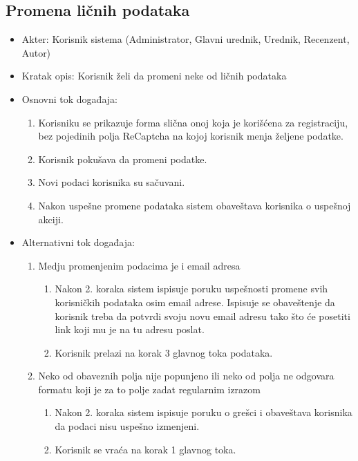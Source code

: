 \documentclass[a4paper]{article}
\begin{document}
\subsection{Promena ličnih podataka}
\begin{itemize}
    \item Akter: Korisnik sistema (Administrator, Glavni urednik, Urednik, Recenzent, Autor)
    \item Kratak opis: Korisnik želi da promeni neke od ličnih podataka
    \item Osnovni tok događaja:
        \begin{enumerate}
            \item Korisniku se prikazuje forma slična onoj koja je korišćena za registraciju, bez pojedinih polja ReCaptcha na kojoj korisnik menja željene podatke.
            \item Korisnik pokušava da promeni podatke.
            \item Novi podaci korisnika su sačuvani.
            \item Nakon uspešne promene podataka sistem obaveštava korisnika o uspešnoj akciji.
        \end{enumerate}
    \item Alternativni tok događaja:
        \begin{enumerate}
            \item Medju promenjenim podacima je i email adresa
                \begin{enumerate}
                    \item Nakon 2. koraka sistem ispisuje poruku uspešnosti promene svih korisničkih podataka osim email adrese. Ispisuje se obaveštenje da korisnik treba da potvrdi svoju novu email adresu tako što će posetiti link koji mu je na tu adresu poslat.
                    \item Korisnik prelazi na korak 3 glavnog toka podataka.
                \end{enumerate}
            \item Neko od obaveznih polja nije popunjeno ili neko od polja ne odgovara formatu koji je za to polje zadat regularnim izrazom
                \begin{enumerate}
                    \item Nakon 2. koraka sistem ispisuje poruku o grešci i obaveštava korisnika da podaci nisu uspešno izmenjeni.
                    \item Korisnik se vraća na korak 1 glavnog toka.
                \end{enumerate}
        \end{enumerate}
\end{itemize}
\end{document}
